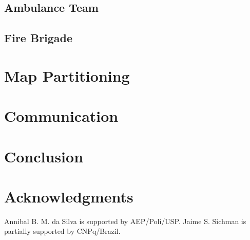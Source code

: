 \documentclass{llncs}
\begin{document}
\subsection{Ambulance Team}
	\label{subsec:ambulanceTeam}
	

\subsection{Fire Brigade}
	\label{subsec:fireBrigade}
	

\section{Map Partitioning}
	\label{sec:partitioning}
	

\section{Communication}
	\label{sec:communication}
	

\section{Conclusion}
	\label{sec:conclusion}
	

\section*{Acknowledgments}
\label{sec:acknowledgments}
Annibal B. M. da Silva is supported by AEP/Poli/USP. Jaime S. Sichman is partially supported by CNPq/Brazil.


\end{document}
